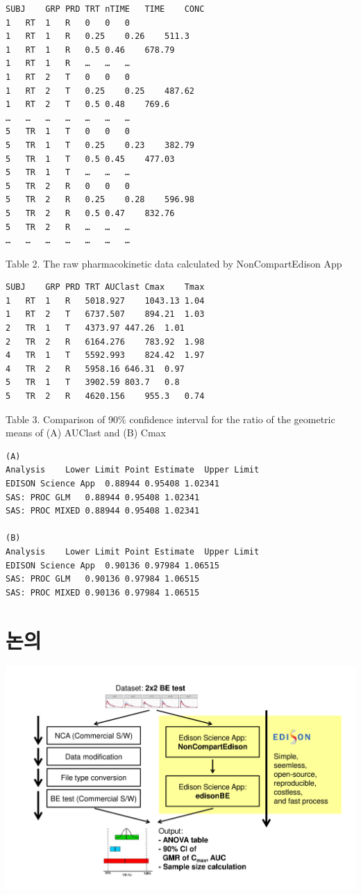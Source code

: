\documentclass[12pt,]{krantz}
\begin{document}
\begin{verbatim}
SUBJ    GRP PRD TRT nTIME   TIME    CONC
1   RT  1   R   0   0   0
1   RT  1   R   0.25    0.26    511.3
1   RT  1   R   0.5 0.46    678.79
1   RT  1   R   …   …   …
1   RT  2   T   0   0   0
1   RT  2   T   0.25    0.25    487.62
1   RT  2   T   0.5 0.48    769.6
…   …   …   …   …   …   …
5   TR  1   T   0   0   0
5   TR  1   T   0.25    0.23    382.79
5   TR  1   T   0.5 0.45    477.03
5   TR  1   T   …   …   …
5   TR  2   R   0   0   0
5   TR  2   R   0.25    0.28    596.98
5   TR  2   R   0.5 0.47    832.76
5   TR  2   R   …   …   …
…   …   …   …   …   …   …
\end{verbatim}

Table 2. The raw pharmacokinetic data calculated by NonCompartEdison App

\begin{verbatim}
SUBJ    GRP PRD TRT AUClast Cmax    Tmax
1   RT  1   R   5018.927    1043.13 1.04
1   RT  2   T   6737.507    894.21  1.03
2   TR  1   T   4373.97 447.26  1.01
2   TR  2   R   6164.276    783.92  1.98
4   TR  1   T   5592.993    824.42  1.97
4   TR  2   R   5958.16 646.31  0.97
5   TR  1   T   3902.59 803.7   0.8
5   TR  2   R   4620.156    955.3   0.74
\end{verbatim}

Table 3. Comparison of 90\% confidence interval for the ratio of the geometric means of (A) AUClast and (B) Cmax

\begin{verbatim}
(A)
Analysis    Lower Limit Point Estimate  Upper Limit
EDISON Science App  0.88944 0.95408 1.02341
SAS: PROC GLM   0.88944 0.95408 1.02341
SAS: PROC MIXED 0.88944 0.95408 1.02341

(B)         
Analysis    Lower Limit Point Estimate  Upper Limit
EDISON Science App  0.90136 0.97984 1.06515
SAS: PROC GLM   0.90136 0.97984 1.06515
SAS: PROC MIXED 0.90136 0.97984 1.06515
\end{verbatim}

\hypertarget{discussion}{%
\chapter{논의}\label{discussion}}

\includegraphics{assets-paper/figure-3.png}
\end{document}
